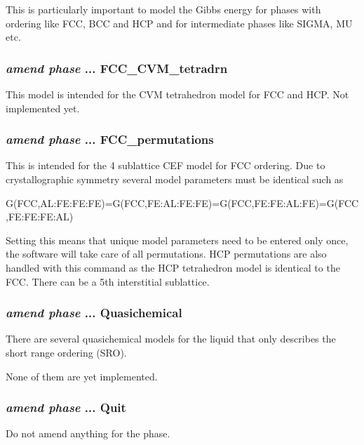 \documentclass[11pt]{article}
\begin{document}
This is particularly important to model the Gibbs energy for phases
with ordering like FCC, BCC and HCP and for intermediate phases like
SIGMA, MU etc.

\hypertarget{Amend FCC-CVM-tetradrn}{}
\subsubsection{{\em amend phase} ... FCC\_CVM\_tetradrn}

This model is intended for the CVM tetrahedron model for FCC and HCP.
Not implemented yet.

\hypertarget{Amend FCC-permutations}{}
\subsubsection{{\em amend phase} ... FCC\_permutations}

This is intended for the 4 sublattice CEF model for FCC ordering.  Due
to crystallographic symmetry several model parameters must be
identical such as

G(FCC,AL:FE:FE:FE)=G(FCC,FE:AL:FE:FE)=G(FCC,FE:FE:AL:FE)=G(FCC,FE:FE:FE:AL)

Setting this means that unique model parameters need to be entered
only once, the software will take care of all permutations.  HCP
permutations are also handled with this command as the HCP tetrahedron
model is identical to the FCC.  There can be a 5th interstitial
sublattice.

\hypertarget{Amend quasichemical}{}
\subsubsection{{\em amend phase} ... Quasichemical}

There are several quasichemical models for the liquid that only
describes the short range ordering (SRO).

None of them are yet implemented.

\hypertarget{Amend phase ... quit}{}
\subsubsection{{\em amend phase} ... Quit}

Do not amend anything for the phase.

\hypertarget{Amend phase ternary extrapol}{}
\end{document}
